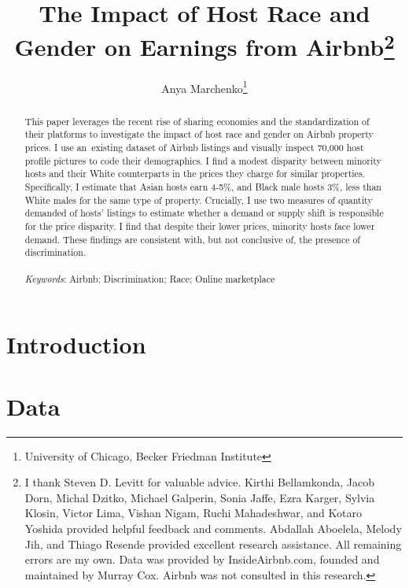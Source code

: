\documentclass[11pt, oneside]{article}
\begin{document}
		
	\title{The Impact of Host Race and Gender on Earnings from Airbnb\footnote
		{I thank Steven D. Levitt for valuable advice. Kirthi Bellamkonda, Jacob Dorn, Michal Dzitko, Michael Galperin, Sonia Jaffe, Ezra Karger, Sylvia Klosin, Victor Lima, Vishan Nigam, Ruchi Mahadeshwar, and Kotaro Yoshida provided helpful feedback and comments. Abdallah Aboelela, Melody Jih, and Thiago Resende provided excellent research assistance. All remaining errors are my own. Data was provided by InsideAirbnb.com, founded and maintained by Murray Cox. Airbnb was not consulted in this research.}}
	\author{Anya Marchenko\footnote{University of Chicago, Becker Friedman Institute}}
	\maketitle
	
	\begin{abstract}
		This paper leverages the recent rise of sharing economies and the standardization of their platforms to investigate the impact of host race and gender on Airbnb property prices. I use an existing dataset of Airbnb listings and visually inspect 70,000 host profile pictures to code their demographics. I find a modest disparity between minority hosts and their White counterparts in the prices they charge for similar properties. Specifically, I estimate that Asian hosts earn 4-5\%, and Black male hosts 3\%, less than White males for the same type of property. Crucially, I use two measures of quantity demanded of hosts' listings to estimate whether a demand or supply shift is responsible for the price disparity. I find that despite their lower prices, minority hosts face lower demand. These findings are consistent with, but not conclusive of, the presence of discrimination. 
		\\\\
		\textit{Keywords}: Airbnb; Discrimination; Race; Online marketplace
		
	\end{abstract}
	
	\newpage
	
	\singlespacing
	\section{Introduction}
	
	\label{lit}

	\section{Data}
	
	\label{data}
	
\end{document}
